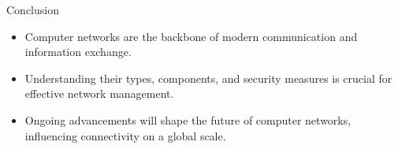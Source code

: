 \begin{frame}{Conclusion}
  \begin{itemize}
    \item Computer networks are the backbone of modern communication and information exchange.
    \item Understanding their types, components, and security measures is crucial for effective network management.
    \item Ongoing advancements will shape the future of computer networks, influencing connectivity on a global scale.
  \end{itemize}
\end{frame}
